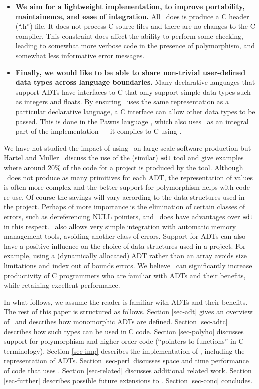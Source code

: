 \begin{itemize}
\item \textbf{We aim for a lightweight implementation, to improve
portability, maintainence, and ease of integration.}
All \adtpp\ does is produce
a C header (``.h'') file.  It does not process C source files and there
are no changes to the C compiler.  This constraint does affect the ability
to perform some checking, leading to somewhat more verbose code in the
presence of polymorphism, and somewhat less informative error messages.

\item  \textbf{Finally, we would like to be able to share
non-trivial user-defined data types across language boundaries.}
Many declarative languages that support ADTs have interfaces to
C that only support simple data types such as integers and floats.
By ensuring \adtpp\ uses the same representation as a particular
declarative language, a C interface can allow other data types to
be passed.  This is done in the Pawns language \cite{pawns-sharing}, which
also uses \adtpp\ as an integral part of the implementation ---
it compiles to C using \adtpp.

\end{itemize}

We have not studied the impact of using \adtpp\ on large scale software
production but Hartel and Muller~\cite{adttool} discuss the use of the
(similar)
\texttt{adt} tool and give examples where around 20\% of the code for
a project is produced by the tool.  Although \adtpp\ does not produce as
many primitives for each ADT, the representation of values is often more
complex and the better support for polymorphism helps with code re-use.
Of course the savings will vary according to the data structures used in
the project.  Perhaps of more importance is the elimination of certain
classes of errors, such as dereferencing NULL pointers, and \adtpp\ does
have advantages over \texttt{adt} in this respect.  \Adtpp\ also
allows very simple integration with automatic memory management tools,
avoiding another class of errors.  Support for ADTs can also have a
positive influence on the choice of data structures used in a project.
For example, using a (dynamically allocated) ADT rather than an array
avoids size limitations and index out of bounds errors.  We believe
\adtpp\ can significantly increase productivity of C programmers who
are familiar with ADTs and their benefits, while retaining excellent
performance.

In what follows, we assume the reader is familiar with ADTs and their
benefits.
The rest of this paper is structured as follows.
Section \ref{sec-adt} gives an overview of \adtpp\ and describes
how monomorphic ADTs are defined.
Section \ref{sec-adtc} describes how such types can be used in C code.
Section \ref{sec-polyho} discusses support for polymorphism and higher
order code (``pointers to functions'' in C terminology).
Section \ref{sec-imp} describes the implementation of \adtpp, including
the representation of ADTs.
Section \ref{sec-perf} discusses space and time performance of code
that uses \adtpp.
Section \ref{sec-related} discusses additional related work.
Section \ref{sec-further} describes possible future extensions to
\adtpp.
Section \ref{sec-conc} concludes.

